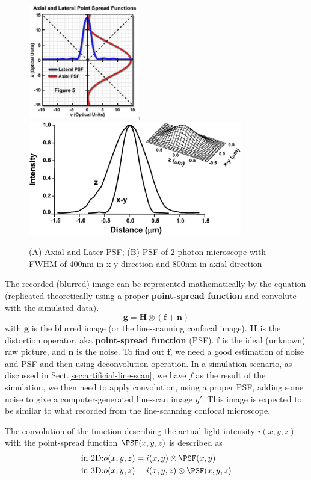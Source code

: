 \begin{figure}[hbt]
  \centerline{\includegraphics[height=5cm,
    angle=0]{./images/psf_info.eps},\includegraphics[height=5cm,
    angle=0]{./images/PSF_LSM410.eps}}
  \caption{(A) Axial and Later PSF; (B) PSF of 2-photon microscope with FWHM of
  400nm in x-y direction and 800nm in axial direction \citep{soeller1999}}
\label{fig:psf_info}
\end{figure}

The recorded (blurred) image can be represented mathematically by the equation
(replicated theoretically using a proper {\bf point-spread function} and
convolute with the simulated data).
\begin{equation}
\mathbf{g  = H \otimes (f + n)}
\end{equation}
with $\mathbf{g}$ is the blurred image (or the line-scanning confocal image).
$\mathbf{H}$ is the distortion operator, aka {\bf point-spread function} (PSF).
$\mathbf{f}$ is the ideal (unknown) raw picture, and $\mathbf{n}$ is the noise.
To find out $\mathbf{f}$, we need a good estimation of noise and PSF and then using
deconvolution operation. In a simulation scenario, as discussed in Sect.\ref{sec:artificial-line-scan}, we
have $f$ as the result of the simulation, we then need to apply  convolution,
using a proper PSF, adding some noise to give a computer-generated  line-scan
image $g'$. This image is expected  to be similar to what recorded from the
line-scanning confocal microscope.

\begin{framed}
The convolution of the function describing the actual light intensity
$i(x,y,z)$ with the point-spread function $\PSF(x,y,z)$ is described as
\begin{equation}
  \label{eq:1110}
  \begin{split}
  &\text{in 2D:} o(x,y,z) = i(x,y) \otimes \PSF(x,y) \\
  &\text{in 3D:} o(x,y,z) = i(x,y,z) \otimes \PSF(x,y,z)
  \end{split}
\end{equation}

\end{framed}

